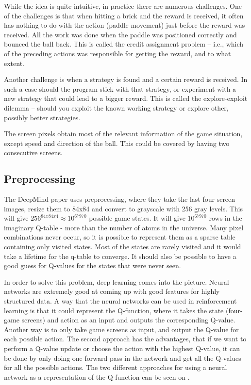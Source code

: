 While the idea is quite intuitive, in practice there are numerous challenges. One of the challenges is that when hitting a brick and the reward is received, it often has nothing to do with the action (paddle movement) just before the reward was received. All the work was done when the paddle was positioned correctly and bounced the ball back. This is called the credit assignment problem – i.e., which of the preceding actions was responsible for getting the reward, and to what extent. 

Another challenge is when a strategy is found and a certain reward is received. In such a case should the program stick with that strategy, or experiment with a new strategy that could lead to a bigger reward. This is called the explore-exploit dilemma – should you exploit the known working strategy or explore other, possibly better strategies.

The screen pixels obtain most of the relevant information of the game situation, except speed and direction of the ball. This could be covered by having two consecutive screens.

\subsection{Preprocessing}
The DeepMind paper uses preprocessing, where they take the last four screen images, resize them to 84x84 and convert to grayscale with 256 gray levels. This will give $256^{84x84x4} \approx 10^{67970}$ possible game states. It will give $10^{67970}$ rows in the imaginary Q-table - more than the number of atoms in the universe. Many pixel combinations never occur, so it is possible to represent them as a sparse table containing only visited states. Most of the states are rarely visited and it would take a lifetime for the q-table to converge. It should also be possible to have a good guess for Q-values for the states that were never seen.  

In order to solve this problem, deep learning comes into the picture. Neural networks are extremely good at coming up with good features for highly structured data. A way that the neural networks can be used in reinforcement learning is that it could represent the Q-function, where it takes the state (four-game screens) and action as an input and outputs the corresponding Q-value. Another way is to only take game screens as input, and output the Q-value for each possible action. The second approach has the advantages, that if we want to perform a Q-value update or choose the action with the highest Q-value, it can be done by only doing one forward pass in the network and get all the Q-values for all the possible actions. The two different approaches for using a neural network as a representation of the Q-function can be seen on .               

